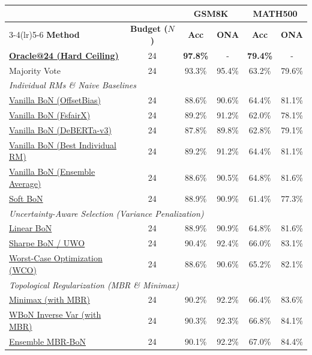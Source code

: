 \documentclass[a4paper,11pt]{article}
\begin{document}
\begin{table}[H]
\centering
\begin{tabular}{l c cc cc}
\toprule
& & \multicolumn{2}{c}{\textbf{GSM8K}} & \multicolumn{2}{c}{\textbf{MATH500}} \\
\cmidrule(lr){3-4}\cmidrule(lr){5-6}
\textbf{Method} & \textbf{Budget ($N$)} & \textbf{Acc} & \textbf{ONA} & \textbf{Acc} & \textbf{ONA} \\
\midrule
\hyperref[sec:oracle]{\textbf{Oracle@24 (Hard Ceiling)}} & 24 & \textbf{97.8\%} & - & \textbf{79.4\%} & - \\
Majority Vote & 24 & 93.3\% & 95.4\% & 63.2\% & 79.6\% \\
\midrule
\multicolumn{6}{l}{\textit{Individual RMs \& Naive Baselines}} \\
\hyperref[sec:vanilla_bon]{Vanilla BoN (OffsetBias)} & 24 & 88.6\% & 90.6\% & 64.4\% & 81.1\% \\
\hyperref[sec:vanilla_bon]{Vanilla BoN (FsfairX)} & 24 & 89.2\% & 91.2\% & 62.0\% & 78.1\% \\
\hyperref[sec:vanilla_bon]{Vanilla BoN (DeBERTa-v3)} & 24 & 87.8\% & 89.8\% & 62.8\% & 79.1\% \\
\hyperref[sec:vanilla_bon]{Vanilla BoN (Best Individual RM)} & 24 & 89.2\% & 91.2\% & 64.4\% & 81.1\% \\
\hyperref[sec:ensemble]{Vanilla BoN (Ensemble Average)} & 24 & 88.6\% & 90.5\% & 64.8\% & 81.6\% \\
\hyperref[sec:soft_bon]{Soft BoN} & 24 & 88.9\% & 90.9\% & 61.4\% & 77.3\% \\
\midrule
\multicolumn{6}{l}{\textit{Uncertainty-Aware Selection (Variance Penalization)}} \\
\hyperref[sec:variance]{Linear BoN} & 24 & 88.9\% & 90.9\% & 64.8\% & 81.6\% \\
\hyperref[sec:variance]{Sharpe BoN / UWO} & 24 & 90.4\% & 92.4\% & 66.0\% & 83.1\% \\
\hyperref[sec:ensemble]{Worst-Case Optimization (WCO)} & 24 & 88.6\% & 90.6\% & 65.2\% & 82.1\% \\
\midrule
\multicolumn{6}{l}{\textit{Topological Regularization (MBR \& Minimax)}} \\
\hyperref[sec:topo]{Minimax (with MBR)} & 24 & 90.2\% & 92.2\% & 66.4\% & 83.6\% \\
\hyperref[sec:topo]{WBoN Inverse Var (with MBR)} & 24 & 90.3\% & 92.3\% & 66.8\% & 84.1\% \\
\hyperref[sec:topo]{Ensemble MBR-BoN} & 24 & 90.1\% & 92.2\% & 67.0\% & 84.4\% \\

\end{tabular}
\end{table}
\end{document}
